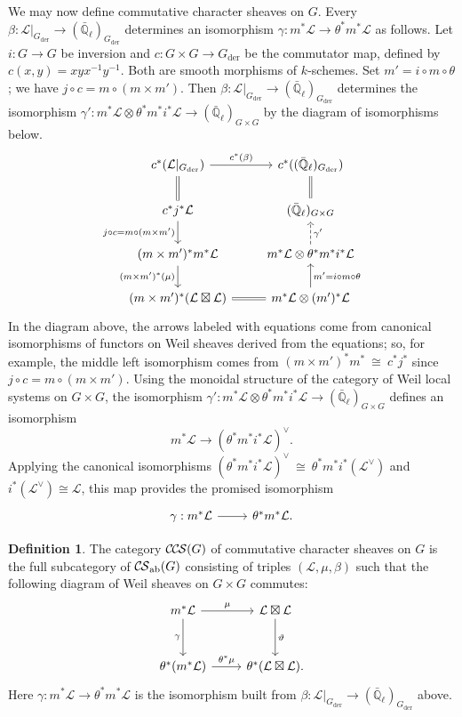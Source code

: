 \documentclass[10pt]{amsart}
\theoremstyle{plain}
\theoremstyle{definition}
\newtheorem{definition}[theorem]{Definition}
\newcommand{\EE}{\mathbb{\bar Q}_\ell}
\newcommand{\Fq}{k}
\newcommand{\der}{_{\operatorname{der}}}
\newcommand{\iso}{{\ \cong\ }}
\newcommand{\cs}[1]{{\mathcal{#1}}}
\newcommand{\CS}{{\mathcal{C\hskip-0.8pt S}}}
\newcommand{\CCS}{{\mathcal{C\hskip-.8pt C\hskip-0.8pt S}}}
\newcommand{\CSab}{\CS_{\operatorname{ab}}}
\begin{document}
We may now define commutative character sheaves on $G$.
%
Every $\beta : \cs{L}\vert_{G\der} \to (\EE)_{G\der}$ determines an isomorphism $\gamma : m^*\cs{L} \to \theta^*m^*\cs{L}$ as follows.
Let $i : G \to G$ be inversion and $c : G\times G\to G\der$ be the commutator map, defined by $c(x,y)= xyx^{-1}y^{-1}$.
Both are smooth morphisms of $\Fq$-schemes.
Set $m' = i \circ m \circ \theta$; we have $j\circ c = m \circ (m \times m')$.
Then $\beta : \cs{L}\vert_{G\der} \to (\EE)_{G\der}$ determines the isomorphism $\gamma' : m^*\cs{L} \otimes \theta^* m^* i^*\cs{L} \to (\EE)_{G\times G}$ by the diagram of isomorphisms below.
\begin{equation}
\begin{tikzcd}
\arrow[equal]{d} c^* (\cs{L}\vert_{G\der}) \arrow{r}{c^*(\beta)} 
	&  c^*((\EE)_{G\der}) \arrow[equal]{d} \\
\arrow{d}[swap]{j\circ c = m \circ (m \times m')} c^* j^* \cs{L} 
	&   (\EE)_{G\times G} \\
(m \times m')^* m^* \cs{L} \arrow{d}[swap]{(m \times m')^*(\mu)} 
	&  m^*\cs{L} \otimes \theta^* m^* i^* \cs{L}  \arrow[dashed]{u}[swap]{\gamma'} \\
(m \times m')^* (\cs{L} \boxtimes \cs{L}) \arrow[equal]{r} 
	& m^*\cs{L} \otimes (m')^*\cs{L} \arrow{u}[swap]{m' = i\circ m\circ \theta} 
\end{tikzcd}
\end{equation}
In the diagram above, the arrows labeled with equations come from canonical isomorphisms of functors on Weil sheaves derived from the equations; so, for example, the middle left isomorphism comes from $(m\times m')^* m^* \iso c^* j^*$ since $j\circ c = m \circ (m \times m')$.
Using the monoidal structure of the category of Weil local systems on $G\times G$, the isomorphism $\gamma' : m^*\cs{L} \otimes \theta^* m^* i^*\cs{L} \to (\EE)_{G\times G}$ defines an isomorphism
\[
m^*\cs{L} \to (\theta^* m^* i^*\cs{L})^\vee.
\]
Applying the canonical isomorphisms $(\theta^* m^* i^*\cs{L})^\vee \iso \theta^* m^* i^* (\cs{L}^\vee)$ and $i^*(\cs{L}^\vee) \cong \cs{L}$, this map provides the promised isomorphism
\[
\begin{tikzcd}
\gamma : m^*\cs{L} \arrow{r} & \theta^* m^* \cs{L}.
\end{tikzcd}
\]

\begin{definition}\label{def:CCS}
The category $\CCS(G)$ of commutative character sheaves on $G$ is the full subcategory of $\CSab(G)$ consisting of triples $(\cs{L},\mu,\beta)$ such that the following diagram of Weil sheaves on $G \times G$ commutes:
  \[
  \begin{tikzcd}[row sep=30]
   m^*\cs{L} \arrow{d}[swap]{\gamma} \arrow{r}{\mu} & \cs{L}\boxtimes\cs{L} \arrow{d}{\vartheta}\\
   \theta^*(m^*\cs{L}) \arrow{r}{{\theta}^*\mu} &  \theta^*(\cs{L}\boxtimes\cs{L}).
  \end{tikzcd}
  \]
Here $\gamma : m^*\cs{L} \to \theta^* m^* \cs{L}$ is the isomorphism built from $\beta : \cs{L}\vert_{G\der} \to (\EE)_{G\der}$ above. 
\end{definition}
\end{document}

